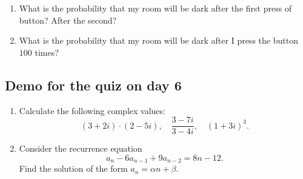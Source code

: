 \documentclass[12pt]{article}
\begin{document}
\begin{enumerate}
\begin{enumerate}
    \item What is the probability that my room will be dark after the first press of button? After the second?
    \item What is the probability that my room will be dark after I press the button $100$ times?
\end{enumerate}


\end{enumerate}

\subsection*{Demo for the quiz on day 6}

\begin{enumerate} 
    \item Calculate the following complex values: 
    \[
    (3 + 2i) \cdot (2 - 5i), \quad \frac{3 - 7i}{3 - 4i}, \quad (1 + 3i)^3.
    \]
    \item Consider the recurrence equation
    \[
    a_n - 6 a_{n-1} + 9 a_{n-2} = 8 n -12.
    \] 
    Find the solution of the form $a_n = \alpha n + \beta$.

\end{enumerate}
\end{document}
